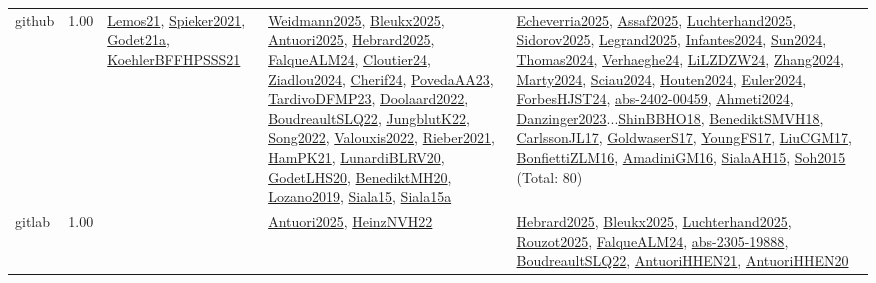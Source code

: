 {\begin{longtable}{p{3cm}r>{\raggedright\arraybackslash}p{6cm}>{\raggedright\arraybackslash}p{6cm}>{\raggedright\arraybackslash}p{8cm}}
\index{github}\index{Benchmarks!github}github &  1.00 & \hyperref[detail:Lemos21]{Lemos21}, \hyperref[detail:Spieker2021]{Spieker2021}, \hyperref[detail:Godet21a]{Godet21a}, \hyperref[detail:KoehlerBFFHPSSS21]{KoehlerBFFHPSSS21} & \hyperref[detail:Weidmann2025]{Weidmann2025}, \hyperref[detail:Bleukx2025]{Bleukx2025}, \hyperref[detail:Antuori2025]{Antuori2025}, \hyperref[detail:Hebrard2025]{Hebrard2025}, \hyperref[detail:FalqueALM24]{FalqueALM24}, \hyperref[detail:Cloutier24]{Cloutier24}, \hyperref[detail:Ziadlou2024]{Ziadlou2024}, \hyperref[detail:Cherif24]{Cherif24}, \hyperref[detail:PovedaAA23]{PovedaAA23}, \hyperref[detail:TardivoDFMP23]{TardivoDFMP23}, \hyperref[detail:Doolaard2022]{Doolaard2022}, \hyperref[detail:BoudreaultSLQ22]{BoudreaultSLQ22}, \hyperref[detail:JungblutK22]{JungblutK22}, \hyperref[detail:Song2022]{Song2022}, \hyperref[detail:Valouxis2022]{Valouxis2022}, \hyperref[detail:Rieber2021]{Rieber2021}, \hyperref[detail:HamPK21]{HamPK21}, \hyperref[detail:LunardiBLRV20]{LunardiBLRV20}, \hyperref[detail:GodetLHS20]{GodetLHS20}, \hyperref[detail:BenediktMH20]{BenediktMH20}, \hyperref[detail:Lozano2019]{Lozano2019}, \hyperref[detail:Siala15]{Siala15}, \hyperref[detail:Siala15a]{Siala15a} & \hyperref[detail:Echeverria2025]{Echeverria2025}, \hyperref[detail:Assaf2025]{Assaf2025}, \hyperref[detail:Luchterhand2025]{Luchterhand2025}, \hyperref[detail:Sidorov2025]{Sidorov2025}, \hyperref[detail:Legrand2025]{Legrand2025}, \hyperref[detail:Infantes2024]{Infantes2024}, \hyperref[detail:Sun2024]{Sun2024}, \hyperref[detail:Thomas2024]{Thomas2024}, \hyperref[detail:Verhaeghe24]{Verhaeghe24}, \hyperref[detail:LiLZDZW24]{LiLZDZW24}, \hyperref[detail:Zhang2024]{Zhang2024}, \hyperref[detail:Marty2024]{Marty2024}, \hyperref[detail:Sciau2024]{Sciau2024}, \hyperref[detail:Houten2024]{Houten2024}, \hyperref[detail:Euler2024]{Euler2024}, \hyperref[detail:ForbesHJST24]{ForbesHJST24}, \hyperref[detail:abs-2402-00459]{abs-2402-00459}, \hyperref[detail:Ahmeti2024]{Ahmeti2024}, \hyperref[detail:Danzinger2023]{Danzinger2023}...\hyperref[detail:ShinBBHO18]{ShinBBHO18}, \hyperref[detail:BenediktSMVH18]{BenediktSMVH18}, \hyperref[detail:CarlssonJL17]{CarlssonJL17}, \hyperref[detail:GoldwaserS17]{GoldwaserS17}, \hyperref[detail:YoungFS17]{YoungFS17}, \hyperref[detail:LiuCGM17]{LiuCGM17}, \hyperref[detail:BonfiettiZLM16]{BonfiettiZLM16}, \hyperref[detail:AmadiniGM16]{AmadiniGM16}, \hyperref[detail:SialaAH15]{SialaAH15}, \hyperref[detail:Soh2015]{Soh2015} (Total: 80)\\
\index{gitlab}\index{Benchmarks!gitlab}gitlab &  1.00 &  & \hyperref[detail:Antuori2025]{Antuori2025}, \hyperref[detail:HeinzNVH22]{HeinzNVH22} & \hyperref[detail:Hebrard2025]{Hebrard2025}, \hyperref[detail:Bleukx2025]{Bleukx2025}, \hyperref[detail:Luchterhand2025]{Luchterhand2025}, \hyperref[detail:Rouzot2025]{Rouzot2025}, \hyperref[detail:FalqueALM24]{FalqueALM24}, \hyperref[detail:abs-2305-19888]{abs-2305-19888}, \hyperref[detail:BoudreaultSLQ22]{BoudreaultSLQ22}, \hyperref[detail:AntuoriHHEN21]{AntuoriHHEN21}, \hyperref[detail:AntuoriHHEN20]{AntuoriHHEN20}\\

\end{longtable}}
